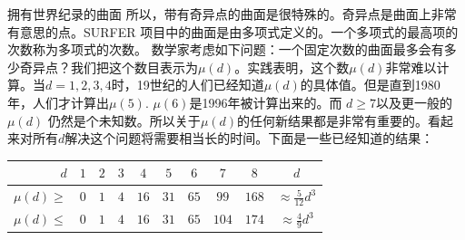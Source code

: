 \begin{surferIntroPage}[拥有世界纪录的曲面]{拥有世界纪录的曲面}
所以，带有奇异点的曲面是很特殊的。奇异点是曲面上非常有意思的点。SURFER 项目中的曲面是由多项式定义的。一个多项式的最高项的次数称为多项式的次数。
数学家考虑如下问题：一个固定次数的曲面最多会有多少奇异点？我们把这个数目表示为$\mu(d)$。实践表明，这个数$\mu(d)$非常难以计算。当$d=1,2,3,4$时，19世纪的人们已经知道$\mu(d)$的具体值。但是直到1980年，人们才计算出$\mu(5)$.
$\mu(6)$是1996年被计算出来的。而 $d\ge 7$以及更一般的 $\mu(d)$ 仍然是个未知数。所以关于$\mu(d)$的任何新结果都是非常有重要的。看起来对所有$d$解决这个问题将需要相当长的时间。下面是一些已经知道的结果：
   \begin{center}
      \begin{tabular}{r|cccccccc|c}
        $d$ & $1$ & $2$ & $3$ & $4$ & $5$ & $6$ & $7$ & $8$ & $d$\\
        \hline
        \hline
        \rule{0pt}{1.2em}$\mu(d)\ge$ & $0$ & $1$ & $4$ & $16$ & $31$ & $65$ &
        $99$ & $168$ &
        $\approx \frac{5}{12}d^3$\\[0.3em]
        \hline
        \rule{0pt}{1.2em}$\mu(d)\le$ & $0$ & $1$ & $4$ & $16$ & $31$ & $65$ &
        $104$ & $174$ & $\approx \frac{4}{9}d^3$
      \end{tabular}
    \end{center}
\end{surferIntroPage}


